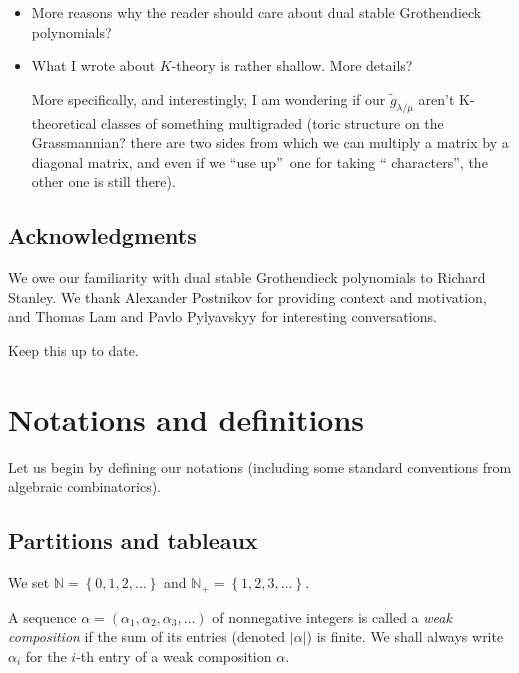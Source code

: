 \documentclass[numbers=enddot,12pt,final,onecolumn,notitlepage]{scrartcl}%
\theoremstyle{definition}
\newenvironment{todo}{}{}
\begin{document}
\begin{todo}
\begin{itemize}
\item More reasons why the reader should
care about dual stable Grothendieck polynomials?

\item What I wrote about $K$-theory is rather shallow. More details?

More specifically, and interestingly, I am wondering if our $\widetilde{g}%
_{\lambda/\mu}$ aren't K-theoretical classes of something multigraded (toric
structure on the Grassmannian? there are two sides from which we can multiply
a matrix by a diagonal matrix, and even if we \textquotedblleft use
up\textquotedblright\ one for taking \textquotedblleft
characters\textquotedblright, the other one is still there).
\end{itemize}
\end{todo}

\subsection{Acknowledgments}

We owe our familiarity with dual stable Grothendieck polynomials to Richard
Stanley. We thank Alexander Postnikov for providing context and motivation,
and Thomas Lam and Pavlo Pylyavskyy for interesting conversations.

\begin{todo}
Keep this up to date.
\end{todo}

\section{\label{sect.notations}Notations and definitions}

Let us begin by defining our notations (including some standard conventions
from algebraic combinatorics).

\subsection{Partitions and tableaux}

We set $\mathbb{N}=\left\{  0,1,2,\ldots\right\}  $ and $\mathbb{N}%
_{+}=\left\{  1,2,3,\ldots\right\}  $. 


 A sequence $\alpha=\left(\alpha_{1},\alpha_{2},\alpha_{3},\ldots\right)$ of nonnegative integers is called a \textit{weak composition} if the sum of its entries (denoted $\left\vert \alpha\right\vert$) is finite.
 We shall always write $\alpha_i$ for the $i$-th entry of a weak composition $\alpha$.
\end{document}
